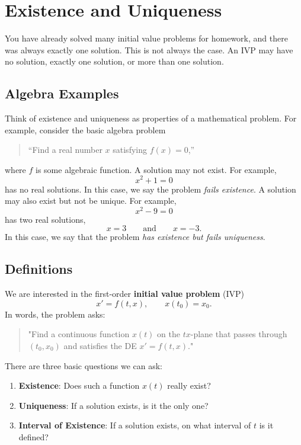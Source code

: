 \documentclass[11pt,letterpaper]{article}
\begin{document}

\section{Existence and Uniqueness}

You have already solved many initial value problems for homework, and there
was always exactly one solution. This is not always the case. An IVP may have
no solution, exactly one solution, or more than one solution.

\subsection{Algebra Examples}

Think of existence and uniqueness as properties of a mathematical problem.
For example, consider the basic algebra problem
\begin{quote}
``Find a real number $x$ satisfying $f(x)=0$,''
\end{quote}
where $f$ is some algebraic function. A solution may not exist. For example,
\[
x^2+1=0
\]
has no real solutions. In this case, we say the problem \textit{fails existence}. A solution may also exist but not be unique. For example,
\[
x^2-9=0
\]
has two real solutions,
\[
x=3
\qquad\text{and}\qquad
x=-3.
\]
In this case, we say that the problem \textit{has existence but fails uniqueness}.


\subsection{Definitions}

We are interested in the first-order \textbf{initial value problem} (IVP) 
\[
x'=f(t,x), \qquad x(t_0)=x_0.
\]
In words, the problem asks:
\begin{quote}
    "Find a continuous function $x(t)$ on the $tx$-plane that passes through $(t_0,x_0)$ and satisfies the DE $x'=f(t,x)$."
\end{quote}
There are three basic questions we can ask:
\begin{enumerate}
    \item \textbf{Existence}: Does such a function $x(t)$ really exist?
    \item \textbf{Uniqueness}: If a solution exists, is it the only one?
    \item \textbf{Interval of Existence}: If a solution exists, on what
    interval of $t$ is it defined?
\end{enumerate}
\end{document}
